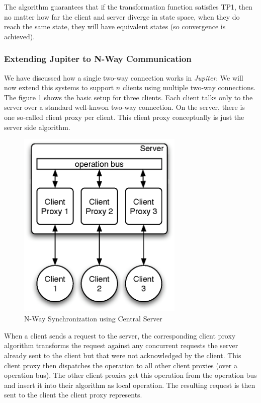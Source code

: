 The algorithm guarantees that if the transformation function satisfies TP1, then no matter how far the client and server diverge in state space, when they do reach the same state, they will have equivalent states (so convergence is achieved).

\subsubsection{Extending Jupiter to N-Way Communication}
We have discussed how a single two-way connection works in \emph{Jupiter}. We will now extend this systems to support $n$ clients using multiple two-way connections. The figure \ref{fig:concepts.nway-details} shows the basic setup for three clients. Each client talks only to the server over a standard well-knwon two-way connection. On the server, there is one so-called client proxy per client. This client proxy conceptually is just the server side algorithm. 

\begin{figure}[htb]
 \centering
 \includegraphics[width=7.9cm,height=9.06cm]{../../images/concepts_nway-details.eps}
 \caption{N-Way Synchronization using Central Server}
 \label{fig:concepts.nway-details}
\end{figure}

When a client sends a request to the server, the corresponding client proxy algorithm transforms the request against any concurrent requests the server already sent to the client but that were not acknowledged by the client. This client proxy then dispatches the operation to all other client proxies (over a operation bus). The other client proxies get this operation from the operation bus and insert it into their algorithm as local operation. The resulting request is then sent to the client the client proxy represents. 

